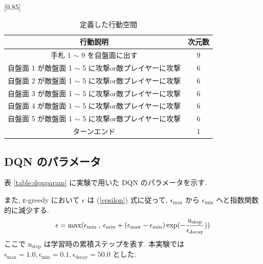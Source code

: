 \documentclass[twocolumn]{jarticle}
\begin{document}
  \begin{table}[t]
    \centering
    \caption{定義した行動空間}
    \vspace{-0.3cm}
    \label{table:action}
    \scalebox{0.80}[0.85]{
      \begin{tabular}{|c|c|}
        \hline
        行動説明                          & 次元数        \\ \hline \hline
        手札 1 $\sim$ 9 を自盤面に出す             & 9          \\ \hline
        自盤面 1 が敵盤面 1 $\sim$ 5 に攻撃or敵プレイヤーに攻撃    & 6          \\ \hline
        自盤面 2 が敵盤面 1 $\sim$ 5 に攻撃or敵プレイヤーに攻撃    & 6          \\ \hline
        自盤面 3 が敵盤面 1 $\sim$ 5 に攻撃or敵プレイヤーに攻撃    & 6          \\ \hline
        自盤面 4 が敵盤面 1 $\sim$ 5 に攻撃or敵プレイヤーに攻撃    & 6          \\ \hline
        自盤面 5 が敵盤面 1 $\sim$ 5 に攻撃or敵プレイヤーに攻撃    & 6          \\ \hline
        ターンエンド & 1 \\ \hline
        \end{tabular}
    }
    \end{table}
  
  \subsection{DQN のパラメータ}
  表 \ref{table:dqnparam} に実験で用いた DQN のパラメータを示す. \par
  また, ε-greedy において $\epsilon$ は (\ref{epsilon}) 式に従って, $\mathrm{\epsilon_{max}}$ から $\mathrm{\epsilon_{min}}$ へと指数関数的に減少する. 
  \begin{equation}
    \vspace{-0.3cm}
    \small
    \label{epsilon}
    \epsilon = \mathrm{max}(\mathrm{\epsilon_{min}} \: , \: \mathrm{\epsilon_{min}} + (\mathrm{\epsilon_{max} - \epsilon_{min}}) \exp(- \frac{\mathrm{n_{step}}}{\mathrm{\epsilon_{decay}}}))
  \end{equation}
  ここで $\mathrm{n_{step}}$ は学習時の累積ステップを表す. 本実験では $\mathrm{\epsilon_{max}} = 1.0, \mathrm{\epsilon_{min}} = 0.1, \mathrm{\epsilon_{decay}} = 50.0$ とした.  
\end{document}
